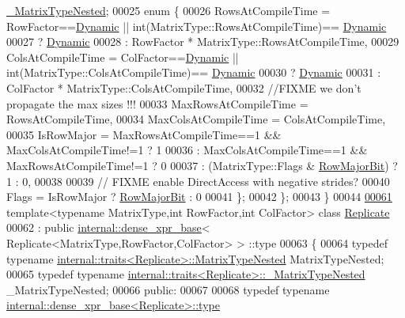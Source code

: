 \begin{DoxyCode}
      \hyperlink{group___sparse_core___module}{\_MatrixTypeNested};
00025   \textcolor{keyword}{enum} \{
00026     RowsAtCompileTime = RowFactor==\hyperlink{namespace_eigen_ad81fa7195215a0ce30017dfac309f0b2}{Dynamic} || int(MatrixType::RowsAtCompileTime)==
      \hyperlink{namespace_eigen_ad81fa7195215a0ce30017dfac309f0b2}{Dynamic}
00027                       ? \hyperlink{namespace_eigen_ad81fa7195215a0ce30017dfac309f0b2}{Dynamic}
00028                       : RowFactor * MatrixType::RowsAtCompileTime,
00029     ColsAtCompileTime = ColFactor==\hyperlink{namespace_eigen_ad81fa7195215a0ce30017dfac309f0b2}{Dynamic} || int(MatrixType::ColsAtCompileTime)==
      \hyperlink{namespace_eigen_ad81fa7195215a0ce30017dfac309f0b2}{Dynamic}
00030                       ? \hyperlink{namespace_eigen_ad81fa7195215a0ce30017dfac309f0b2}{Dynamic}
00031                       : ColFactor * MatrixType::ColsAtCompileTime,
00032    \textcolor{comment}{//FIXME we don't propagate the max sizes !!!}
00033     MaxRowsAtCompileTime = RowsAtCompileTime,
00034     MaxColsAtCompileTime = ColsAtCompileTime,
00035     IsRowMajor = MaxRowsAtCompileTime==1 && MaxColsAtCompileTime!=1 ? 1
00036                : MaxColsAtCompileTime==1 && MaxRowsAtCompileTime!=1 ? 0
00037                : (MatrixType::Flags & \hyperlink{group__flags_gae4f56c2a60bbe4bd2e44c5b19cbe8762}{RowMajorBit}) ? 1 : 0,
00038     
00039     \textcolor{comment}{// FIXME enable DirectAccess with negative strides?}
00040     Flags = IsRowMajor ? \hyperlink{group__flags_gae4f56c2a60bbe4bd2e44c5b19cbe8762}{RowMajorBit} : 0
00041   \};
00042 \};
00043 \}
00044 
\hyperlink{group___core___module}{00061} \textcolor{keyword}{template}<\textcolor{keyword}{typename} MatrixType,\textcolor{keywordtype}{int} RowFactor,\textcolor{keywordtype}{int} ColFactor> \textcolor{keyword}{class }\hyperlink{group___core___module_class_eigen_1_1_replicate}{Replicate}
00062   : \textcolor{keyword}{public} \hyperlink{struct_eigen_1_1internal_1_1dense__xpr__base}{internal::dense\_xpr\_base}< Replicate<MatrixType,RowFactor,ColFactor> >
      ::type
00063 \{
00064     \textcolor{keyword}{typedef} \textcolor{keyword}{typename} \hyperlink{struct_eigen_1_1internal_1_1traits}{internal::traits<Replicate>::MatrixTypeNested}
       MatrixTypeNested;
00065     \textcolor{keyword}{typedef} \textcolor{keyword}{typename} \hyperlink{struct_eigen_1_1internal_1_1traits}{internal::traits<Replicate>::\_MatrixTypeNested}
       \_MatrixTypeNested;
00066   \textcolor{keyword}{public}:
00067 
00068     \textcolor{keyword}{typedef} \textcolor{keyword}{typename} \hyperlink{struct_eigen_1_1internal_1_1dense__xpr__base}{internal::dense\_xpr\_base<Replicate>::type} 

\end{DoxyCode}

